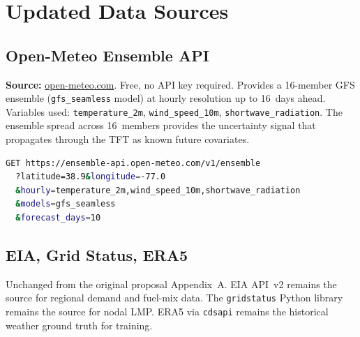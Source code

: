 \documentclass[10pt,letterpaper]{article}
\newcommand{\tft}{\textsc{TFT}\xspace}
\begin{document}
\appendix
\section{Updated Data Sources}

\subsection{Open-Meteo Ensemble API}

\textbf{Source:} \url{open-meteo.com}. Free, no API key required. Provides a
16-member GFS ensemble (\texttt{gfs\_seamless} model) at hourly resolution up to
16~days ahead. Variables used: \texttt{temperature\_2m}, \texttt{wind\_speed\_10m},
\texttt{shortwave\_radiation}. The ensemble spread across 16~members provides the
uncertainty signal that propagates through the \tft as known future covariates.

\begin{lstlisting}[language=bash,
  caption={Open-Meteo ensemble query for Dominion Hub (Northern Virginia).}]
GET https://ensemble-api.open-meteo.com/v1/ensemble
  ?latitude=38.9&longitude=-77.0
  &hourly=temperature_2m,wind_speed_10m,shortwave_radiation
  &models=gfs_seamless
  &forecast_days=10
\end{lstlisting}

\subsection{EIA, Grid Status, ERA5}

Unchanged from the original proposal Appendix~A. EIA API~v2 remains the source for
regional demand and fuel-mix data. The \texttt{gridstatus} Python library remains the
source for nodal LMP. ERA5 via \texttt{cdsapi} remains the historical weather ground
truth for training.
\end{document}
